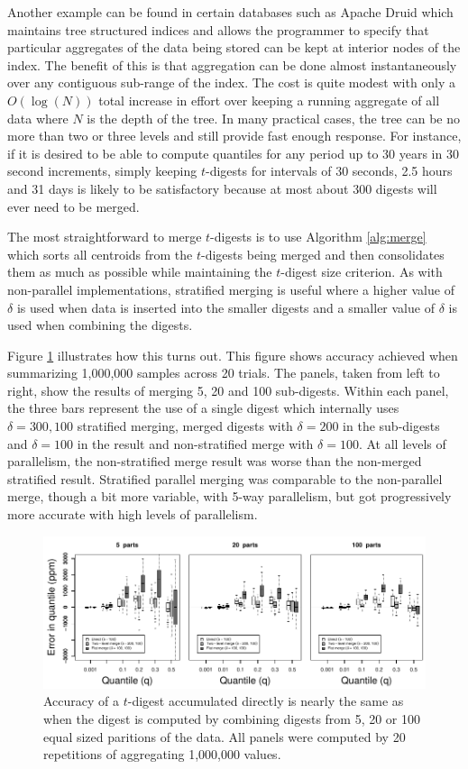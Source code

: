 \documentclass[]{statsoc}
\begin{document}
Another example can be found in certain databases such as Apache Druid which maintains tree structured indices and allows the programmer to specify that particular aggregates of the data being stored can be kept at interior nodes of the index.  The benefit of this is that aggregation can be done almost instantaneously over any contiguous sub-range of the index.  The cost is quite modest with only a $O(\log(N))$ total increase in effort over keeping a running aggregate of all data where $N$ is the depth of the tree.  In many practical cases, the tree can be no more than two or three levels and still provide fast enough response.  For instance, if it is desired to be able to compute quantiles for any period up to 30 years in 30 second increments, simply keeping $t$-digests for intervals of 30 seconds, 2.5 hours and 31 days is likely to be satisfactory because at most about 300 digests will ever need to be merged.  

The most straightforward to merge $t$-digests is to use Algorithm \ref{alg:merge} which sorts all centroids from the $t$-digests being merged and then consolidates them as much as possible while maintaining the $t$-digest size criterion. As with non-parallel implementations, stratified merging is useful where a higher value of $\delta$ is used when data is inserted into the smaller digests and a smaller value of $\delta$ is used when combining the digests. 

Figure \ref{fig:merge} illustrates how this turns out. This figure shows accuracy achieved when summarizing 1,000,000 samples across 20 trials. The panels, taken from left to right, show the results of merging 5, 20 and 100 sub-digests. Within each panel, the three bars represent the use of a single digest which internally uses $\delta=300,100$ stratified merging, merged digests with $\delta=200$ in the sub-digests and $\delta=100$ in the result and non-stratified merge with $\delta=100$. At all levels of parallelism, the non-stratified merge result was worse than the non-merged stratified result. Stratified parallel merging was comparable to the non-parallel merge, though a bit more variable, with 5-way parallelism, but got progressively more accurate with high levels of parallelism.

\begin{figure}[htb] %
   \centering
   \includegraphics[width=5.5in]{merge.pdf} 
   \caption{Accuracy of a $t$-digest accumulated directly is nearly the same as when the digest is computed by combining digests from 5, 20 or 100 equal sized paritions of the data.  All panels were computed by 20 repetitions of aggregating 1,000,000 values. }
   \label{fig:merge}
\end{figure}
\end{document}
